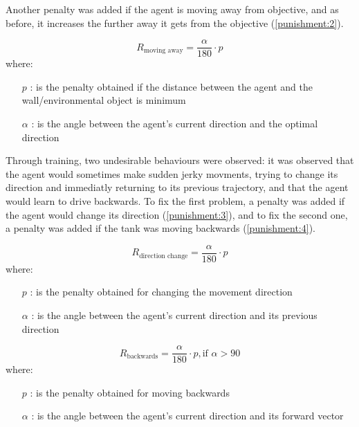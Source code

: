 Another penalty was added if the agent is moving away from objective, and as before, it increases the further away it gets from the objective (\ref{punishment:2}). 

\begin{equation} \label{punishment:2}
    R_\text{moving away} = \frac{\alpha}{180} \cdot p
\end{equation}
where:
\begin{itemize}
    \item [$p$]: is the penalty obtained if the distance between the agent and the wall/environmental object is minimum
    \item [$\alpha$]: is the angle between the agent's current direction and the optimal direction
\end{itemize}

Through training, two undesirable behaviours were observed: it was observed that the agent would sometimes make sudden jerky movments, trying to change its direction and immediatly returning to its previous trajectory, and that the agent would learn to drive backwards. To fix the first problem, a penalty was added if the agent would change its direction (\ref{punishment:3}), and to fix the second one, a penalty was added if the tank was moving backwards (\ref{punishment:4}).

\begin{equation} \label{punishment:3}
    R_\text{direction change} = \frac{\alpha}{180} \cdot p
\end{equation}
where:
\begin{itemize}
    \item [$p$]: is the penalty obtained for changing the movement direction
    \item [$\alpha$]: is the angle between the agent's current direction and its previous direction
\end{itemize}

\begin{equation} \label{punishment:4}
    R_\text{backwards} = \frac{\alpha}{180} \cdot p, \text{if } \alpha > 90
\end{equation}
where:
\begin{itemize}
    \item [$p$]: is the penalty obtained for moving backwards
    \item [$\alpha$]: is the angle between the agent's current direction and its forward vector
\end{itemize}


